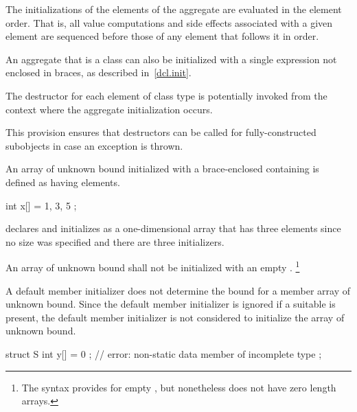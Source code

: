 \pnum
The initializations of the elements of the aggregate
are evaluated in the element order.
That is,
all value computations and side effects associated with a given element
are sequenced before
those of any element that follows it in order.

\pnum
An aggregate that is a class can also be initialized with a single
expression not enclosed in braces, as described in~\ref{dcl.init}.

\pnum
The destructor for each element of class type
is potentially invoked
from the context where the aggregate initialization occurs.
\begin{note}
This provision ensures that destructors can be called
for fully-constructed subobjects
in case an exception is thrown.
\end{note}

\pnum
An array of unknown bound initialized with a
brace-enclosed
containing
is defined as having
elements.
\begin{example}

\begin{codeblock}
int x[] = { 1, 3, 5 };
\end{codeblock}

declares and initializes
as a one-dimensional array that has three elements
since no size was specified and there are three initializers.
\end{example}
An array of unknown bound shall not be initialized with
an empty  \tcode{\{\}}.%
\footnote{The syntax provides for empty ,
but nonetheless \Cpp{} does not have zero length arrays.}
\begin{note}
A default member initializer does not determine the bound for a member
array of unknown bound.  Since the default member initializer is
ignored if a suitable  is present,
the default member initializer is not
considered to initialize the array of unknown bound.
\begin{example}
\begin{codeblock}
struct S {
  int y[] = { 0 };          // error: non-static data member of incomplete type
};
\end{codeblock}
\end{example}
\end{note}

